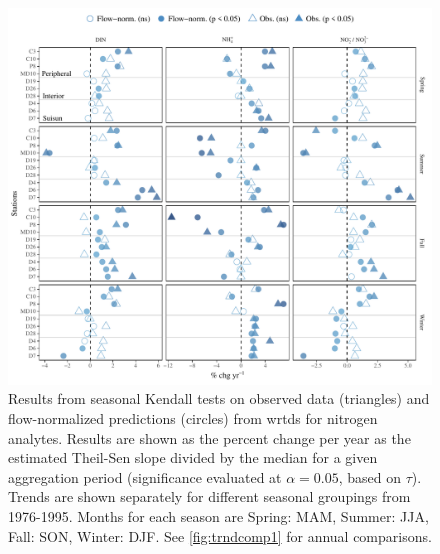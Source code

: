 \documentclass[journal = esthag, manuscript = article]{achemso}\usepackage[]{graphicx}\usepackage[]{color}
\newcommand{\beginsupplement}{%
        \setcounter{table}{0}
        \renewcommand{\thetable}{S\arabic{table}}%
        \setcounter{figure}{0}
        \renewcommand{\thefigure}{S\arabic{figure}}%
     }
\begin{document}
\begin{suppinfo}
\beginsupplement

\begin{figure}
\centering
\includegraphics[width=1\textwidth,page=1]{figs/trndcomp2.pdf}
\caption{Results from seasonal Kendall tests on observed data (triangles) and flow-normalized predictions (circles) from \ac{wrtds} for nitrogen analytes. Results are shown as the percent change per year as the estimated Theil-Sen slope divided by the median for a given aggregation period (significance evaluated at $\alpha = 0.05$, based on $\tau$). Trends are shown separately for different seasonal groupings from 1976-1995. Months for each season are Spring: MAM, Summer: JJA, Fall: SON, Winter: DJF. See \cref{fig:trndcomp1} for annual comparisons.}
\label{fig:trndcomp2}   
\end{figure}


\end{suppinfo}
\end{document}
